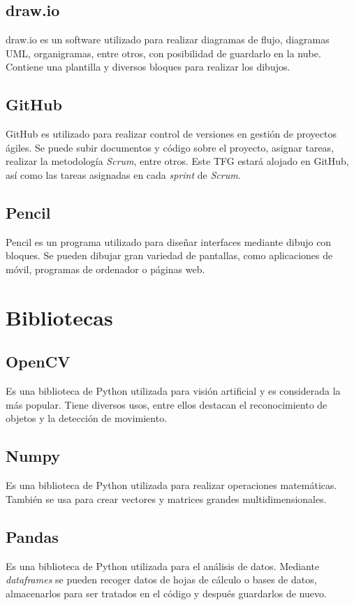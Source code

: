 \subsection{draw.io}
draw.io es un software utilizado para realizar diagramas de flujo, diagramas UML, organigramas, entre otros, con posibilidad de guardarlo en la nube. Contiene una plantilla y diversos bloques para realizar los dibujos.

\subsection{GitHub}
GitHub es utilizado para realizar control de versiones en gestión de proyectos ágiles. Se puede subir documentos y código sobre el proyecto, asignar tareas, realizar la metodología \textit{Scrum}, entre otros. Este TFG estará alojado en GitHub, así como las tareas asignadas en cada \textit{sprint} de \textit{Scrum}.

\subsection{Pencil}
Pencil es un programa utilizado para diseñar interfaces mediante dibujo con bloques. Se pueden dibujar gran variedad de pantallas, como aplicaciones de móvil, programas de ordenador o páginas web.

\section{Bibliotecas}
\subsection{OpenCV}
Es una biblioteca de Python utilizada para visión artificial y es considerada la más popular. Tiene diversos usos, entre ellos destacan el reconocimiento de objetos y la detección de movimiento.~\cite{wiki:opencv}

\subsection{Numpy}
Es una biblioteca de Python utilizada para realizar operaciones matemáticas. También se usa para crear vectores y matrices grandes multidimensionales.~\cite{wiki:numpy}

\subsection{Pandas}
Es una biblioteca de Python utilizada para el análisis de datos. Mediante \textit{dataframes} se pueden recoger datos de hojas de cálculo o bases de datos, almacenarlos para ser tratados en el código y después guardarlos de nuevo.~\cite{wiki:pandas}

